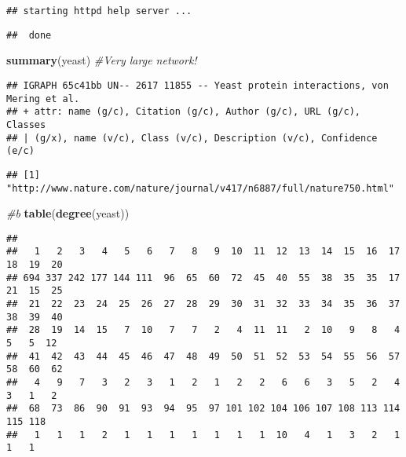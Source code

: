 \documentclass[
]{article}
\newenvironment{Shaded}{\begin{snugshade}}{\end{snugshade}}
\newcommand{\CommentTok}[1]{\textcolor[rgb]{0.56,0.35,0.01}{\textit{#1}}}
\newcommand{\KeywordTok}[1]{\textcolor[rgb]{0.13,0.29,0.53}{\textbf{#1}}}
\newcommand{\NormalTok}[1]{#1}
\newcommand{\OperatorTok}[1]{\textcolor[rgb]{0.81,0.36,0.00}{\textbf{#1}}}
\begin{document}
\begin{verbatim}
## starting httpd help server ...
\end{verbatim}

\begin{verbatim}
##  done
\end{verbatim}

\begin{Shaded}
\begin{Highlighting}[]
\KeywordTok{summary}\NormalTok{(yeast)    }\CommentTok{#Very large network!}
\end{Highlighting}
\end{Shaded}

\begin{verbatim}
## IGRAPH 65c41bb UN-- 2617 11855 -- Yeast protein interactions, von Mering et al.
## + attr: name (g/c), Citation (g/c), Author (g/c), URL (g/c), Classes
## | (g/x), name (v/c), Class (v/c), Description (v/c), Confidence (e/c)
\end{verbatim}

\begin{Shaded}
\end{Shaded}

\begin{verbatim}
## [1] "http://www.nature.com/nature/journal/v417/n6887/full/nature750.html"
\end{verbatim}

\begin{Shaded}
\begin{Highlighting}[]
\CommentTok{#b}
\KeywordTok{table}\NormalTok{(}\KeywordTok{degree}\NormalTok{(yeast))}
\end{Highlighting}
\end{Shaded}

\begin{verbatim}
## 
##   1   2   3   4   5   6   7   8   9  10  11  12  13  14  15  16  17  18  19  20 
## 694 337 242 177 144 111  96  65  60  72  45  40  55  38  35  35  17  21  15  25 
##  21  22  23  24  25  26  27  28  29  30  31  32  33  34  35  36  37  38  39  40 
##  28  19  14  15   7  10   7   7   2   4  11  11   2  10   9   8   4   5   5  12 
##  41  42  43  44  45  46  47  48  49  50  51  52  53  54  55  56  57  58  60  62 
##   4   9   7   3   2   3   1   2   1   2   2   6   6   3   5   2   4   3   1   2 
##  68  73  86  90  91  93  94  95  97 101 102 104 106 107 108 113 114 115 118 
##   1   1   1   2   1   1   1   1   1   1   1  10   4   1   3   2   1   1   1
\end{verbatim}
\end{document}
